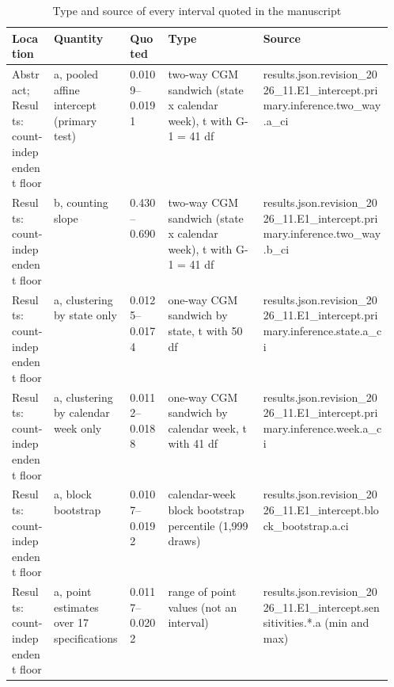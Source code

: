 \begin{table}[!tbp]
\centering
\tiny
\setlength{\tabcolsep}{3pt}
\caption{Type and source of every interval quoted in the manuscript}
\label{tab:r2-interval-types}
\begin{tabularx}{\linewidth}{@{}p{0.11\linewidth}p{0.2\linewidth}lp{0.25\linewidth}X@{}}
\toprule
Location & Quantity & Quoted & Type & Source \\
\midrule
Abstract; Results: count-independent floor & a, pooled affine intercept (primary test) & 0.0109--0.0191 & two-way CGM sandwich (state x calendar week), t with G-1 = 41 df & {\ttfamily\tiny results.\allowbreak{}json.\allowbreak{}revision\_2026\_11.\allowbreak{}E1\_intercept.\allowbreak{}primary.\allowbreak{}inference.\allowbreak{}two\_way.\allowbreak{}a\_ci} \\
Results: count-independent floor & b, counting slope & 0.430--0.690 & two-way CGM sandwich (state x calendar week), t with G-1 = 41 df & {\ttfamily\tiny results.\allowbreak{}json.\allowbreak{}revision\_2026\_11.\allowbreak{}E1\_intercept.\allowbreak{}primary.\allowbreak{}inference.\allowbreak{}two\_way.\allowbreak{}b\_ci} \\
Results: count-independent floor & a, clustering by state only & 0.0125--0.0174 & one-way CGM sandwich by state, t with 50 df & {\ttfamily\tiny results.\allowbreak{}json.\allowbreak{}revision\_2026\_11.\allowbreak{}E1\_intercept.\allowbreak{}primary.\allowbreak{}inference.\allowbreak{}state.\allowbreak{}a\_ci} \\
Results: count-independent floor & a, clustering by calendar week only & 0.0112--0.0188 & one-way CGM sandwich by calendar week, t with 41 df & {\ttfamily\tiny results.\allowbreak{}json.\allowbreak{}revision\_2026\_11.\allowbreak{}E1\_intercept.\allowbreak{}primary.\allowbreak{}inference.\allowbreak{}week.\allowbreak{}a\_ci} \\
Results: count-independent floor & a, block bootstrap & 0.0107--0.0192 & calendar-week block bootstrap percentile (1,999 draws) & {\ttfamily\tiny results.\allowbreak{}json.\allowbreak{}revision\_2026\_11.\allowbreak{}E1\_intercept.\allowbreak{}block\_bootstrap.\allowbreak{}a.\allowbreak{}ci} \\
Results: count-independent floor & a, point estimates over 17 specifications & 0.0117--0.0202 & range of point values (not an interval) & {\ttfamily\tiny results.\allowbreak{}json.\allowbreak{}revision\_2026\_11.\allowbreak{}E1\_intercept.\allowbreak{}sensitivities.\allowbreak{}*.\allowbreak{}a (min and max)} \\

\end{tabularx}
\end{table}
